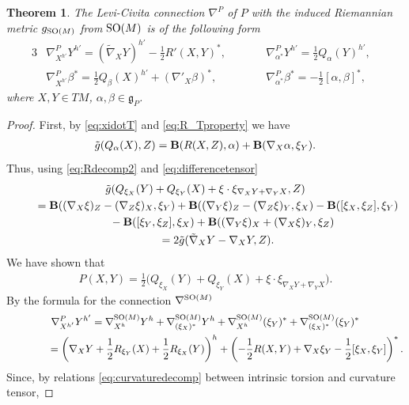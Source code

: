 \documentclass[10pt,a4paper]{amsart}
\numberwithin{equation}{section}
\newtheorem{Theorem}{Theorem}[section]
\begin{document}
\begin{Theorem}\label{thm:nablaP}
The Levi-Civita connection $\nabla^P$ of $P$ with the induced Riemannian metric $g_{{\rm SO}(M)}$ from ${\rm SO}(M)$ is of the following form
\begin{alignat*}{3}
& \nabla^P_{X^{h'}}Y^{h'} =(\tilde\nabla_XY)^{h'}-\frac{1}{2}R'(X,Y)^{\ast},\qquad && \nabla^P_{\alpha^{\ast}}Y^{h'} =\frac{1}{2}Q_{\alpha}(Y)^{h'},&\\
& \nabla^P_{X^{h'}}\beta^{\ast} =\frac{1}{2}Q_{\beta}(X)^{h'}+(\nabla'_X\beta)^{\ast},\qquad && \nabla^P_{\alpha^{\ast}}\beta^{\ast} =-\frac{1}{2}[\alpha,\beta]^{\ast},&
\end{alignat*}
where $X,Y\in TM$, $\alpha,\beta\in\mathfrak{g}_P$.
\end{Theorem}
\begin{proof}
First, by \eqref{eq:xidotT} and \eqref{eq:R_Tproperty} we have
\begin{gather*}
\tilde{g}(Q_{\alpha}(X),Z)={\bf B}(R(X,Z),\alpha)+{\bf B}(\nabla_X\alpha,\xi_Y).
\end{gather*}
Thus, using \eqref{eq:Rdecomp2} and \eqref{eq:differencetensor}
\begin{gather*}
\tilde{g}(Q_{\xi_X}(Y)+Q_{\xi_Y}(X)+\xi\cdot\xi_{\nabla_XY+\nabla_YX},Z)\\
\qquad {}= {\bf B}((\nabla_X\xi)_Z-(\nabla_Z\xi)_X,\xi_Y)+{\bf B}((\nabla_Y\xi)_Z-(\nabla_Z\xi)_Y,\xi_X)-{\bf B}([\xi_X,\xi_Z],\xi_Y)\\
\qquad \quad{}-{\bf B}([\xi_Y,\xi_Z],\xi_X)+{\bf B}((\nabla_Y\xi)_X+(\nabla_X\xi)_Y,\xi_Z)\\
\qquad {} =2\tilde{g}(\tilde{\nabla}_XY-\nabla_XY,Z).
\end{gather*}
We have shown that
\begin{gather}\label{eq:nablaPproof}
P(X,Y)=\frac{1}{2}\big(Q_{\xi_X}(Y)+Q_{\xi_Y}(X)+\xi\cdot\xi_{\nabla_XY+\nabla_YX}\big).
\end{gather}
By the formula for the connection $\nabla^{{\rm SO}(M)}$
\begin{gather*}
\nabla^P_{X^{h'}}Y^{h'} = \nabla^{{\rm SO}(M)}_{X^h}Y^h+\nabla^{{\rm SO}(M)}_{(\xi_X)^{\ast}}Y^h
+\nabla^{{\rm SO}(M)}_{X^h}(\xi_Y)^{\ast}+\nabla^{{\rm SO}(M)}_{(\xi_X)^{\ast}}(\xi_Y)^{\ast}\\
\hphantom{\nabla^P_{X^{h'}}Y^{h'}}{}
=\left(\nabla_XY+\frac{1}{2}R_{\xi_Y}(X)+\frac{1}{2}R_{\xi_X}(Y)\right)^h+\left(-\frac{1}{2}R(X,Y)+\nabla_X\xi_Y-\frac{1}{2}[\xi_X,\xi_Y]\right)^{\ast}.
\end{gather*}
Since, by relations \eqref{eq:curvaturedecomp} between intrinsic torsion and curvature tensor,

\end{proof}
\end{document}
